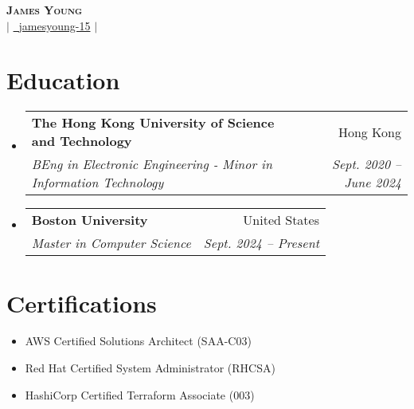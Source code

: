 \documentclass[letterpaper,12pt]{article}
\makeatletter
\newcommand{\resumeSubheading}[4]{
  \vspace{-2pt}\item
    \begin{tabular*}{0.97\textwidth}[t]{l@{\extracolsep{\fill}}r}
      \textbf{#1} & #2 \\
      \textit{\small#3} & \textit{\small #4} \\
    \end{tabular*}\vspace{-7pt}
}
\newcommand{\resumeSubHeadingListStart}{\begin{itemize}[leftmargin=0.05in, label={}]}
\newcommand{\resumeSubHeadingListEnd}{\end{itemize}}
\makeatother
\begin{document}
\begin{center}
    \textbf{\Huge \scshape James Young} \\ \vspace{2pt}
    \href{mailto:jyyoung@bu.edu}{} $|$ 
    \href{https://github.com/jamesyoung-15} {\faGithub\ {jamesyoung-15}} $|$
    \href{https://linkedin.com/in/jamesyyoung}{}
\end{center}


\section{Education}
  \resumeSubHeadingListStart
    \resumeSubheading
      {The Hong Kong University of Science and Technology}{Hong Kong}
      {BEng in Electronic Engineering - Minor in Information Technology}{Sept. 2020 -- June 2024}
  \resumeSubHeadingListEnd
  \resumeSubHeadingListStart
    \resumeSubheading
      {Boston University}{United States}
      {Master in Computer Science}{Sept. 2024 -- Present}
  \resumeSubHeadingListEnd
\vspace{-5pt}

\section{Certifications}
\vspace{-12pt}
    \begin{multicols}{2}
        \begin{itemize}[itemsep=-1pt, parsep=3pt, leftmargin=0.21in]
        \small
            \item AWS Certified Solutions Architect (SAA-C03)
            \item Red Hat Certified System Administrator (RHCSA)
            \item HashiCorp Certified Terraform Associate (003)
        \end{itemize}
    \end{multicols}

\end{document}
